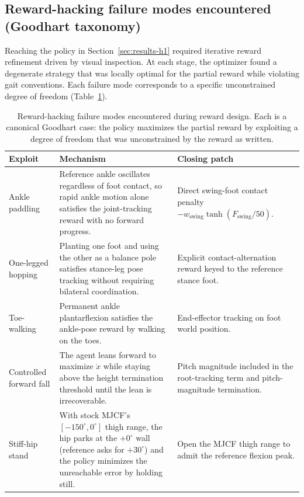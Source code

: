 \documentclass{article}
\begin{document}
\subsection{Reward-hacking failure modes encountered (Goodhart taxonomy)}
\label{sec:results-h2-exploits}

Reaching the policy in Section~\ref{sec:results-h1} required iterative reward refinement driven by visual inspection. At each stage, the optimizer found a degenerate strategy that was locally optimal for the partial reward while violating gait conventions. Each failure mode corresponds to a specific unconstrained degree of freedom (Table~\ref{tab:exploits}).

\begin{table}[t]
\caption{Reward-hacking failure modes encountered during reward design. Each is a canonical Goodhart case: the policy maximizes the partial reward by exploiting a degree of freedom that was unconstrained by the reward as written.}
\label{tab:exploits}
\centering
\small
\begin{tabular}{p{} p{} p{}}
\toprule
\textbf{Exploit} & \textbf{Mechanism} & \textbf{Closing patch} \\
\midrule
Ankle paddling & Reference ankle oscillates regardless of foot contact, so rapid ankle motion alone satisfies the joint-tracking reward with no forward progress. & Direct swing-foot contact penalty $-w_{\text{swing}}\tanh(F_{\text{swing}}/50)$. \\
\addlinespace[2pt]
One-legged hopping & Planting one foot and using the other as a balance pole satisfies stance-leg pose tracking without requiring bilateral coordination. & Explicit contact-alternation reward keyed to the reference stance foot. \\
\addlinespace[2pt]
Toe-walking & Permanent ankle plantarflexion satisfies the ankle-pose reward by walking on the toes. & End-effector tracking on foot world position. \\
\addlinespace[2pt]
Controlled forward fall & The agent leans forward to maximize $\dot x$ while staying above the height termination threshold until the lean is irrecoverable. & Pitch magnitude included in the root-tracking term and pitch-magnitude termination. \\
\addlinespace[2pt]
Stiff-hip stand & With stock MJCF's $[-150^\circ, 0^\circ]$ thigh range, the hip parks at the $+0^\circ$ wall (reference asks for $+30^\circ$) and the policy minimizes the unreachable error by holding still. & Open the MJCF thigh range to admit the reference flexion peak. \\
\bottomrule
\end{tabular}
\end{table}
\end{document}
